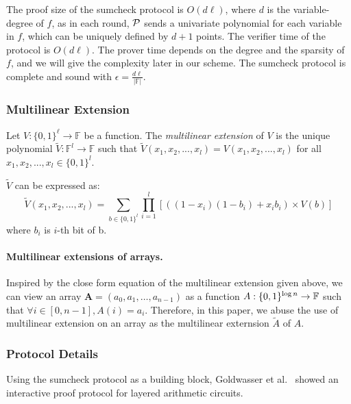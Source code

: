 The proof size of the sumcheck protocol is $O(d\ell)$, where $d$ is the variable-degree of $f$, as in each round, $\P$ sends a univariate polynomial for each variable in $f$, which can be uniquely defined by $d+1$ points. The verifier time of the protocol is $O(d\ell)$. The prover time depends on the degree and the sparsity of $f$, and we will give the complexity later in our scheme. The sumcheck protocol is complete and sound with $\epsilon = \frac{d\ell}{|\mathbb{F}|}$. 

\subsubsection{Multilinear Extension}

\begin{definition}
	Let $V:\{0, 1\}^\ell \rightarrow \mathbb{F}$ be a function. The \textit{multilinear extension} of $V$ is the unique polynomial $\tilde{V}: \mathbb{F}^l \rightarrow \mathbb{F}$ such that $\tilde{V}(x_1, x_2, ..., x_{l}) = V(x_1, x_2, ..., x_{l})$ for all $x_1, x_2, ..., x_{l}\in\{0,1\}^l$.
	
	
	$\tilde{V}$ can be expressed as:
	$$\tilde{V}(x_1, x_2, ..., x_{l})=\sum_{b\in\{0,1\}^l}\prod_{i=1}^{l}[((1-x_i)(1-b_i)+x_ib_i) \times V(b)]$$
	where $b_i$ is $i$-th bit of b.
	
	
\end{definition}

\paragraph{Multilinear extensions of arrays.} Inspired by the close form equation of the multilinear extension given above, we can view an array $\textbf{A} = (a_0, a_1, \ldots, a_{n-1})$ as a function $A: \binary^{\log n}\rightarrow \F$ such that $\forall i\in[0,n-1], A(i) = a_i$. Therefore, in this paper, we abuse the use of multilinear extension on an array as the multilinear externsion $\tilde{A}$ of $A$.    

\subsubsection{Protocol Details}\label{sec::gkr}
Using the sumcheck protocol as a building block, Goldwasser et al.~\cite{GKR} showed an interactive proof protocol for layered arithmetic circuits. 

